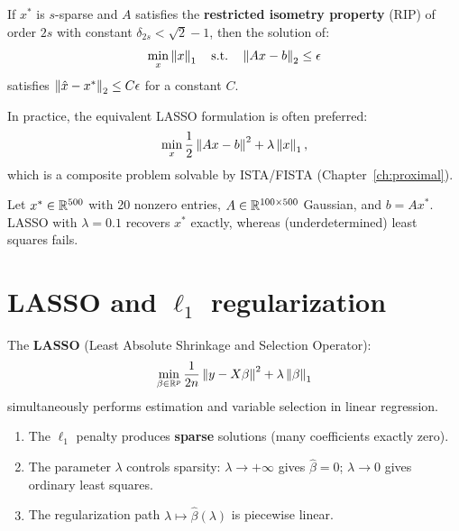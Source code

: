 \begin{theorem}
If $x^*$ is $s$-sparse and $A$ satisfies the \textbf{restricted isometry
property} (RIP) of order $2s$ with constant
$\delta_{2s} < \sqrt{2} - 1$, then the solution of:
\[
  \min_x \left\| x \right\|_1 \quad \text{s.t.} \quad \left\| Ax - b \right\|_2 \leq \epsilon
\]
satisfies $\left\| \hat{x} - x^* \right\|_2 \leq C \epsilon$ for a constant $C$.
\end{theorem}

\begin{remark}
In practice, the equivalent LASSO formulation is often preferred:
\[
  \min_x \frac{1}{2} \left\| Ax - b \right\|^2 + \lambda \left\| x \right\|_1,
\]
which is a composite problem solvable by ISTA/FISTA
(Chapter~\ref{ch:proximal}).
\end{remark}

\begin{example}
Let $x^* \in \mathbb{R}^{500}$ with 20 nonzero entries,
$A \in \mathbb{R}^{100 \times 500}$ Gaussian, and $b = Ax^*$. LASSO with
$\lambda = 0.1$ recovers $x^*$ exactly, whereas (underdetermined) least
squares fails.
\end{example}

\section{LASSO and $\ell_1$ regularization}

\begin{definition}[LASSO]
The \textbf{LASSO} (Least Absolute Shrinkage and Selection Operator):
\[
  \min_{\beta \in \mathbb{R}^p} \frac{1}{2n} \left\| y - X\beta \right\|^2
  + \lambda \left\| \beta \right\|_1
\]
simultaneously performs estimation and variable selection in linear regression.
\end{definition}

\begin{proposition}
\begin{enumerate}
  \item The $\ell_1$ penalty produces \textbf{sparse} solutions (many
        coefficients exactly zero).
  \item The parameter $\lambda$ controls sparsity:
        $\lambda \to +\infty$ gives $\hat{\beta} = 0$;
        $\lambda \to 0$ gives ordinary least squares.
  \item The regularization path
        $\lambda \mapsto \hat{\beta}(\lambda)$ is piecewise linear.
\end{enumerate}
\end{proposition}

